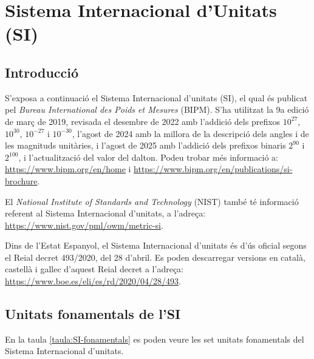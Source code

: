 \chapter{Sistema Internacional d'Unitats (SI)}\label{sec:SI}

\section{Introducció}\label{sec:SI-intro}
S'exposa a continuació el Sistema
Internacional d'unitats (SI), el qual és publicat pel  \textit{Bureau
International des Poids et Mesures} (BIPM). S'ha utilitzat la 9a edició de març de 2019, revisada el desembre de  2022 amb l'addició dels prefixos  $10^{27}$,  $10^{30}$,  $10^{-27}$ i  $10^{-30}$, l'agost de 2024 amb la millora de la descripció dels angles i de les magnituds unitàries, i l'agost de 2025 amb l'addició dels prefixos binaris $2^{90}$ i  $2^{100}$, i l'actualització del valor del dalton. Podeu trobar més informació a: \href{https://www.bipm.org/en/home/}{https:/\!\!/www.bipm.org/en/home} i \href{https://www.bipm.org/en/publications/si-brochure/}{https:/\!\!/www.bipm.org/en/publications/si-brochure}. 

El  \textit{National Institute of Standards and Technology} (NIST) també té informació referent al Sistema
Internacional d'unitats, a l'adreça: \href{https://www.nist.gov/pml/owm/metric-si}
{https:/\!\!/www.nist.gov/pml/owm/metric-si}.

Dins de l'Estat Espanyol, el Sistema Internacional d'unitats és d'ús oficial segons el Reial decret 493/2020, del 28 d'abril. Es poden descarregar versions en català, castellà i gallec d'aquest Reial decret a l'adreça: \href{https://www.boe.es/eli/es/rd/2020/04/28/493}
{https:/\!\!/www.boe.es/eli/es/rd/2020/04/28/493}.

\section{Unitats fonamentals de l'SI}

En la taula \vref{taula:SI-fonamentals} es poden veure les set unitats
fonamentals del Sistema Internacional d'unitats.

